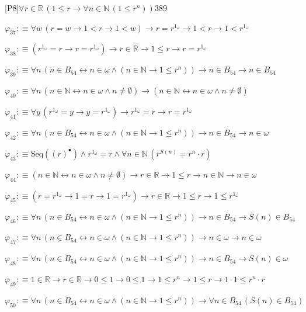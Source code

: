\begin{fullproof}{[P8]}{$\forall r \in \mathbb{R}\,(1 \leq r \to \forall n \in \mathbb{N}\,(1 \leq {{r}^{n}}))$}{389}
\begin{abbrevlist}
\item $\varphi_{37} :\equiv \forall w\,(r = w \to 1 < r \to 1 < w) \to r = {{r}^{1_{\omega}}} \to 1 < r \to 1 < {{r}^{1_{\omega}}}$
\item $\varphi_{38} :\equiv ({{r}^{1_{\omega}}} = r \to r = {{r}^{1_{\omega}}}) \to r \in \mathbb{R} \to 1 \leq r \to r = {{r}^{1_{\omega}}}$
\item $\varphi_{39} :\equiv \forall n\,(n \in B_{54} \leftrightarrow n \in \omega \land (n \in \mathbb{N} \to 1 \leq {{r}^{n}})) \to n \in B_{54} \to n \in B_{54}$
\item $\varphi_{40} :\equiv \forall n\,(n \in \mathbb{N} \leftrightarrow n \in \omega \land n \neq \emptyset) \to (n \in \mathbb{N} \leftrightarrow n \in \omega \land n \neq \emptyset)$
\item $\varphi_{41} :\equiv \forall y\,({{r}^{1_{\omega}}} = y \to y = {{r}^{1_{\omega}}}) \to {{r}^{1_{\omega}}} = r \to r = {{r}^{1_{\omega}}}$
\item $\varphi_{42} :\equiv \forall n\,(n \in B_{54} \leftrightarrow n \in \omega \land (n \in \mathbb{N} \to 1 \leq {{r}^{n}})) \to n \in B_{54} \to n \in \omega$
\item $\varphi_{43} :\equiv \mathrm{Seq}({(r)^{\bullet}}) \land {{r}^{1_{\omega}}} = r \land \forall n \in \mathbb{N}\,({{r}^{S(n)}} = {{r}^{n}} \cdot r)$
\item $\varphi_{44} :\equiv (n \in \mathbb{N} \leftrightarrow n \in \omega \land n \neq \emptyset) \to r \in \mathbb{R} \to 1 \leq r \to n \in \mathbb{N} \to n \in \omega$
\item $\varphi_{45} :\equiv (r = {{r}^{1_{\omega}}} \to 1 = r \to 1 = {{r}^{1_{\omega}}}) \to r \in \mathbb{R} \to 1 \leq r \to 1 \leq {{r}^{1_{\omega}}}$
\item $\varphi_{46} :\equiv \forall n\,(n \in B_{54} \leftrightarrow n \in \omega \land (n \in \mathbb{N} \to 1 \leq {{r}^{n}})) \to n \in B_{54} \to S(n) \in B_{54}$
\item $\varphi_{47} :\equiv \forall n\,(n \in B_{54} \leftrightarrow n \in \omega \land (n \in \mathbb{N} \to 1 \leq {{r}^{n}})) \to n \in \omega \to n \in \omega$
\item $\varphi_{48} :\equiv \forall n\,(n \in B_{54} \leftrightarrow n \in \omega \land (n \in \mathbb{N} \to 1 \leq {{r}^{n}})) \to n \in B_{54} \to S(n) \in \omega$
\item $\varphi_{49} :\equiv 1 \in \mathbb{R} \to r \in \mathbb{R} \to 0 \leq 1 \to 0 \leq 1 \to 1 \leq {{r}^{n}} \to 1 \leq r \to 1 \cdot 1 \leq {{r}^{n}} \cdot r$
\item $\varphi_{50} :\equiv \forall n\,(n \in B_{54} \leftrightarrow n \in \omega \land (n \in \mathbb{N} \to 1 \leq {{r}^{n}})) \to \forall n \in B_{54}\,(S(n) \in B_{54})$

\end{abbrevlist}
\end{fullproof}
